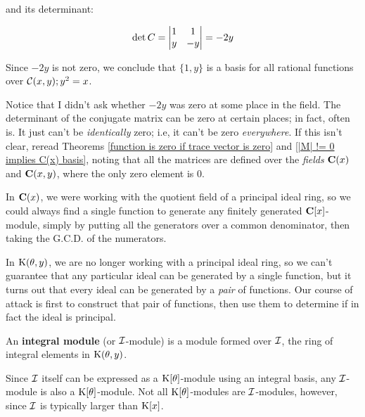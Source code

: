 and its determinant:

$$\det C=\left|\begin{matrix}1&1\cr y&-y\cr\end{matrix}\right| = -2y$$

Since $-2y$ is not zero, we conclude that $\{1, y\}$ is a basis
for all rational functions over ${\cal C}(x,y); y^2=x$.

\endexample

Notice that I didn't ask whether $-2y$ was zero at some place in the
field.  The determinant of the conjugate matrix can be zero at certain
places; in fact, often is.  It just can't be {\it identically} zero;
i.e, it can't be zero {\it everywhere}.  If this isn't clear, reread
Theorems \ref{function is zero if trace vector is zero} and \ref{|M|
!= 0 implies C(x) basis}, noting that all the matrices are defined
over the {\it fields} ${\bf C}(x)$ and ${\bf C}(x,y)$, where the only
zero element is 0.


{}

In ${\bf C}(x)$, we were working with the quotient field of a
principal ideal ring, so we could always find a single function to
generate any finitely generated ${\bf C}[x]$-module, simply by putting
all the generators over a common denominator, then taking the
G.C.D. of the numerators.

In ${\rm K}(\theta,y)$, we are no longer working with a principal ideal
ring, so we can't guarantee that any particular ideal can be generated
by a single function, but it turns out that every ideal can be
generated by a {\it pair} of functions.  Our course of attack is first
to construct that pair of functions, then use them to determine if in
fact the ideal is principal.


An {\bf integral module} (or ${\cal I}$-module) is a module formed
over ${\cal I}$, the ring of integral elements in ${\rm K}(\theta,y)$.

\enddefinition

Since ${\cal I}$ itself can be expressed as a ${\rm K}[\theta]$-module
using an integral basis, any ${\cal I}$-module is also a ${\rm
K}[\theta]$-module.  Not all ${\rm K}[\theta]$-modules are ${\cal
I}$-modules, however, since ${\cal I}$ is typically larger than ${\rm
K}[x]$.


